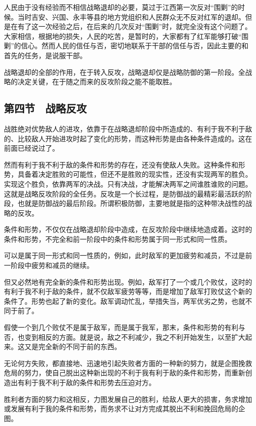 人民由于没有经验而不相信战略退却的必要，莫过于江西第一次反对“围剿”的时候。当时吉安、兴国、永丰等县的地方党组织和人民群众无不反对红军的退却。但是在有了这一次经验之后，在后来的几次反对“围剿”时，就完全没有这个问题了。大家相信，根据地的损失，人民的吃苦，是暂时的，大家都有了红军能够打破“围剿”的信心。然而人民的信任与否，密切地联系于干部的信任与否，因此主要的和首先的任务，是说服干部。

战略退却的全部的作用，在于转入反攻，战略退却仅是战略防御的第一阶段。全战略的决定关键，在于随之而来的反攻阶段之能不能取胜。

\subsection{第四节　战略反攻}

战胜绝对优势敌人的进攻，依靠于在战略退却阶段中所造成的、有利于我不利于敌的、比较敌人开始进攻时起了变化的形势，而这种形势是由各种条件造成的。这在前面已经说过了。

然而有利于我不利于敌的条件和形势的存在，还没有使敌人失败。这种条件和形势，具备着决定胜败的可能性，但还不是胜败的现实性，还没有实现两军的胜负。实现这个胜负，依靠两军的决战。只有决战，才能解决两军之间谁胜谁败的问题。这就是战略反攻阶段的全任务。反攻是一个长过程，是防御战的最精彩最活跃的阶段，也就是防御战的最后阶段。所谓积极防御，主要地就是指的这种带决战性的战略的反攻。

条件和形势，不仅仅在战略退却阶段中造成，在反攻阶段中继续地造成着。这时的条件和形势，不完全和前一阶段中的条件和形势属于同一形式和同一性质。

可以是属于同一形式和同一性质的，例如，此时敌军的更加疲劳和减员，不过是前一阶段中疲劳和减员的继续。

但又必然地有完全新的条件和形势出现。例如，敌军打了一个或几个败仗，这时的有利于我不利于敌的条件，就不仅敌军疲劳等等，而是增加了敌军打败仗这个新的条件了。形势也起了新的变化。敌军调动忙乱，举措失当，两军优劣之势，也就不同于前了。

假使一个到几个败仗不是属于敌军，而是属于我军，那末，条件和形势的有利与否，也变到相反的方面。就是说，敌之不利减少，我之不利开始发生，以至扩大起来。这又是完全新的不同于前的东西。

无论何方失败，都直接地、迅速地引起失败者方面的一种新的努力，就是企图挽救危局的努力，使自己脱出这种新出现的不利于我有利于敌的条件和形势，而重新创造出有利于我不利于敌的条件和形势去压迫对方。

胜利者方面的努力和这相反，力图发展自己的胜利，给敌人更大的损害，务求增加或发展有利于我的条件和形势，而务求不让对方完成其脱出不利和挽回危局的企图。

